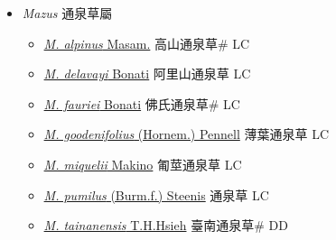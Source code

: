 
  \begin{itemize}
 \item[] \textit{Mazus} 通泉草屬
                    
  \begin{itemize}
        \item[] \href{http://www.theplantlist.org/tpl1.1/search?q=Mazus+alpinus}{\textit{M. alpinus} Masam.}   高山通泉草\# LC
        \item[] \href{http://www.theplantlist.org/tpl1.1/search?q=Mazus+delavayi}{\textit{M. delavayi} Bonati}   阿里山通泉草 LC
        \item[] \href{http://www.theplantlist.org/tpl1.1/search?q=Mazus+fauriei}{\textit{M. fauriei} Bonati}   佛氏通泉草\# LC
        \item[] \href{http://www.theplantlist.org/tpl1.1/search?q=Mazus+goodenifolius}{\textit{M. goodenifolius} (Hornem.) Pennell}   薄葉通泉草 LC
        \item[] \href{http://www.theplantlist.org/tpl1.1/search?q=Mazus+miquelii}{\textit{M. miquelii} Makino}   匍莖通泉草 LC
        \item[] \href{http://www.theplantlist.org/tpl1.1/search?q=Mazus+pumilus}{\textit{M. pumilus} (Burm.f.) Steenis}   通泉草 LC
        \item[] \href{http://www.theplantlist.org/tpl1.1/search?q=Mazus+tainanensis}{\textit{M. tainanensis} T.H.Hsieh}   臺南通泉草\# DD
  \end{itemize}
  \end{itemize}
